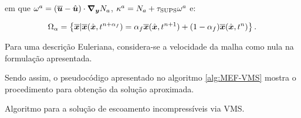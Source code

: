 \noindent em que $\omega^{a}=\left({\overline{\boldsymbol{u}}-\hat{\boldsymbol{u}}}\right)\cdot\boldsymbol{\nabla_y} N_{a}$, $\kappa^{a}=N_a+\tau_{\mathrm{SUPS}}\omega^{a}$ e:

\begin{equation}
    \Omega_\alpha=\left\{\overline{\boldsymbol{x}}|\overline{\boldsymbol{x}}(\hat{\boldsymbol{x}},t^{n+\alpha_f})=\alpha_f\overline{\boldsymbol{x}}(\hat{\boldsymbol{x}},t^{n+1})+(1-\alpha_f)\overline{\boldsymbol{x}}(\hat{\boldsymbol{x}},t^n)\right\}\text{.}
\end{equation}

Para uma descrição Euleriana, considera-se a velocidade da malha como nula na formulação apresentada.

Sendo assim, o pseudocódigo apresentado no algoritmo \ref{alg:MEF-VMS} mostra o procedimento para obtenção da solução aproximada.

\begin{algorithm}[h!]
    \caption{Algoritmo para a solução de escoamento incompressíveis via VMS.}
    \label{alg:MEF-VMS}
\end{algorithm}
